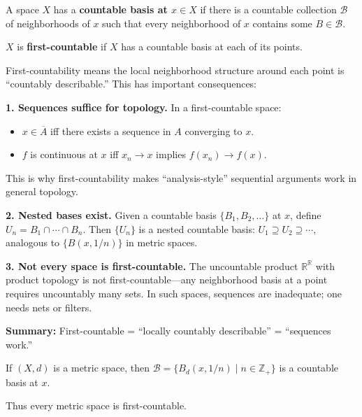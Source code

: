 \documentclass[11pt]{report}
\begin{document}
\begin{defbox}
A space $X$ has a \textbf{countable basis at $x \in X$} if there is a countable collection $\mathcal{B}$ of neighborhoods of $x$ such that every neighborhood of $x$ contains some $B \in \mathcal{B}$.
\end{defbox}

\begin{defbox}
$X$ is \textbf{first-countable} if $X$ has a countable basis at each of its points.
\end{defbox}

\begin{rembox}
First-countability means the local neighborhood structure around each point is ``countably describable.'' This has important consequences:

\textbf{1. Sequences suffice for topology.} In a first-countable space:
\begin{itemize}
    \item $x \in \overline{A}$ iff there exists a sequence in $A$ converging to $x$.
    \item $f$ is continuous at $x$ iff $x_n \to x$ implies $f(x_n) \to f(x)$.
\end{itemize}
This is why first-countability makes ``analysis-style'' sequential arguments work in general topology.

\textbf{2. Nested bases exist.} Given a countable basis $\{B_1, B_2, \ldots\}$ at $x$, define $U_n = B_1 \cap \cdots \cap B_n$. Then $\{U_n\}$ is a nested countable basis: $U_1 \supseteq U_2 \supseteq \cdots$, analogous to $\{B(x, 1/n)\}$ in metric spaces.

\textbf{3. Not every space is first-countable.} The uncountable product $\mathbb{R}^{\mathbb{R}}$ with product topology is not first-countable---any neighborhood basis at a point requires uncountably many sets. In such spaces, sequences are inadequate; one needs nets or filters.

\textbf{Summary:} First-countable = ``locally countably describable'' = ``sequences work.''
\end{rembox}

\begin{exbox}
If $(X, d)$ is a metric space, then $\mathcal{B} = \{B_d(x, 1/n) \mid n \in \mathbb{Z}_+\}$ is a countable basis at $x$.

Thus every metric space is first-countable.
\end{exbox}
\end{document}
